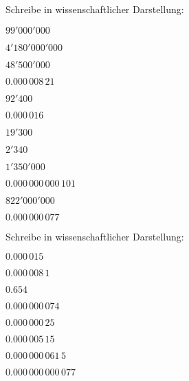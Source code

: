 \documentclass[
twoside,%
ngerman,%
headsepline%
11pt]%
{article}
\begin{document}
\begin{ueb}[factor]
  Schreibe in wissenschaftlicher Darstellung:
  \\[2.5ex]\hspace*{2.7ex}
  \begin{minipage}{0.4\textwidth}
    \begin{enumeratea}
      \item $99'000'000$
      \item $4'180'000'000$
      \item $48'500'000$
      \item $0.000\,008\,21$
      \item $92'400$
      \item $0.000\,016$\\[1ex]
    \end{enumeratea}
  \end{minipage}
  \begin{minipage}{0.23\textwidth}
    \begin{enumeratea}\addtocounter{enumi}{6}
      \item $19'300$
      \item $2'340$
      \item $1'350'000$
      \item $0.000\,000\,000\,101$
      \item $822'000'000$
      \item $0.000\,000\,077$\\[1ex]
    \end{enumeratea}
  \end{minipage}
\end{ueb}


\begin{ueb}[sci]
  Schreibe in wissenschaftlicher Darstellung:
  \\[2.5ex]\hspace*{2.7ex}
  \begin{minipage}{0.4\textwidth}
    \begin{enumeratea}
      \item $0.000\,015$
      \item $0.000\,008\,1$
      \item $0.654$
      \item $0.000\,000\,074$\\[1ex]
    \end{enumeratea}
  \end{minipage}
  \begin{minipage}{0.23\textwidth}
    \begin{enumeratea}\addtocounter{enumi}{4}
      \item $0.000\,000\,25$
      \item $0.000\,005\,15$
      \item $0.000\,000\,061\,5$
      \item $0.000\,000\,000\,077$\\[1ex]
    \end{enumeratea}
  \end{minipage}
\end{ueb}
\end{document}
